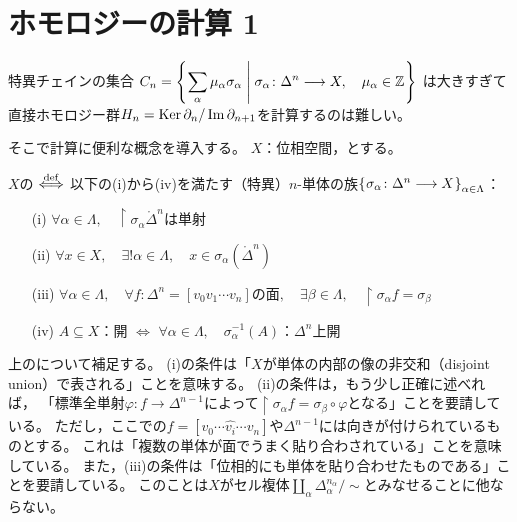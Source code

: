 \documentclass[uplatex]{jsarticle}
\begin{document}
\fi

\section{ホモロジーの計算 1}


特異チェインの集合
${\displaystyle C_{n} = \Set{\hspace{-1.8pt}  \sum_{\alpha} \mu_{\alpha} \sigma_{\alpha} | \sigma_{\alpha} \colon \Delta^{n} \longrightarrow X, \quad \mu_{\alpha} \in \mathbb{Z} \hspace{-1.8pt}}}$
は大きすぎて直接ホモロジー群$H_{n} = \operatorname{Ker} \partial_{n} / \operatorname{Im} \partial_{n+1}$を計算するのは難しい。

そこで計算に便利な概念を導入する。
$X$：位相空間，とする。

\begin{teigi}
	\label{homcalc.complex}
	$X$の $\overset{\mathrm{def}}{\Longleftrightarrow}$ 以下の(i)から(iv)を満たす（特異）$n$-単体の族$\Set{\hspace{-1.8pt} \sigma_{\alpha} \colon \Delta^{n} \longrightarrow X \hspace{-1.8pt}}_{\alpha \in \Lambda}$：
	\begin{enumerate}
		\vspace{-0.5\baselineskip}
		\item[(i)] $\forall \alpha \in \Lambda, \quad \restriction{\sigma_{\alpha}}{\mathring{\Delta}^{n}}$は単射
		\item[(ii)] $\forall x \in X, \quad \exists! \alpha \in \Lambda, \quad x \in \sigma_{\alpha} (\mathring{\Delta}^{n})$
		\item[(iii)] $\forall \alpha \in \Lambda, \quad \forall f : \Delta^{n} = [v_{0}v_{1}\cdots v_{n}]$の面$, \quad \exists \beta \in \Lambda, \quad \restriction{\sigma_{\alpha}}{f} = \sigma_{\beta}$
		\item[(iv)] $A \subseteq X$：開 $\Longleftrightarrow$ $\forall \alpha \in \Lambda, \quad \sigma_{\alpha}^{-1} (A)$：$\Delta^{n}$上開
	\end{enumerate}
\end{teigi}

上のについて補足する。
(i)の条件は「$X$が単体の内部の像の非交和（disjoint union）で表される」ことを意味する。
(ii)の条件は，もう少し正確に述べれば，
「標準全単射$\varphi \colon f \longrightarrow \Delta^{n-1}$によって$\restriction{\sigma_{\alpha}}{f} = \sigma_{\beta} \circ \varphi$となる」ことを要請している。
ただし，ここでの$f = [v_{0} \cdots \hat{v_{i}} \cdots v_{n}]$や$\Delta^{n-1}$には向きが付けられているものとする。
これは「複数の単体が面でうまく貼り合わされている」ことを意味している。
また，(iii)の条件は「位相的にも単体を貼り合わせたものである」ことを要請している。
このことは$X$がセル複体${\displaystyle \coprod_{\alpha} \Delta_{\alpha}^{n_{\alpha}} / \sim}$とみなせることに他ならない。
\end{document}
